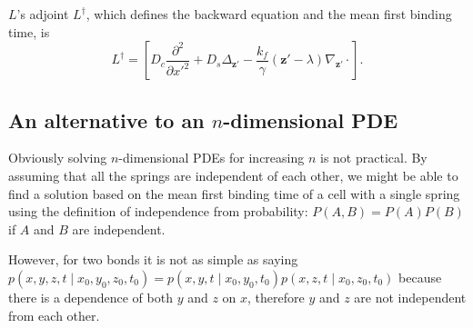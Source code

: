 \documentclass{article}
\newcommand{\stiff}{\frac{k_f}{\gamma}}
\newcommand{\z}{\mathbf{z}}
\begin{document}
$L$'s adjoint $L^\dag$, which defines the backward equation and the
mean first binding time, is
\begin{equation}
  \label{eq:backl-n}
  L^\dag = \left[D_c \frac{\partial^2}{\partial x'^2} + D_s \Delta_{\z'} -
  \stiff (\z' - \lambda) \nabla_{\z'} \cdot \right].
\end{equation}

\subsection{An alternative to an $n$-dimensional PDE}
\label{sec:alternative-n}

Obviously solving $n$-dimensional PDEs for increasing $n$ is not
practical. By assuming that all the springs are independent of each
other, we might be able to find a solution based on the mean first
binding time of a cell with a single spring using the definition of
independence from probability: $P(A, B) = P(A) P(B)$ if $A$ and $B$
are independent.

However, for two bonds it is not as simple as saying $p(x, y, z, t
\mid x_0, y_0, z_0, t_0) = p(x, y, t \mid x_0, y_0, t_0) p(x, z, t
\mid x_0, z_0, t_0)$ because there is a dependence of both $y$ and $z$
on $x$, therefore $y$ and $z$ are not independent from each other.



\end{document}

